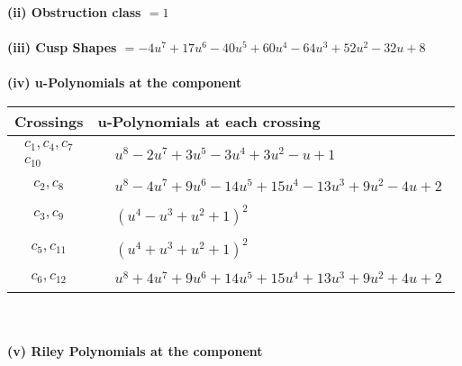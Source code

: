 \documentclass[1p]{elsarticle_modified}
\theoremstyle{definition}
\begin{document}
\flushleft \textbf{(ii) Obstruction class $= 1$}\\~\\
\flushleft \textbf{(iii) Cusp Shapes $= -4 u^7+17 u^6-40 u^5+60 u^4-64 u^3+52 u^2-32 u+8$}\\~\\
\newpage\renewcommand{\arraystretch}{1}
\flushleft \textbf{(iv) u-Polynomials at the component}\newline \\
\begin{tabular}{m{50pt}|m{274pt}}
Crossings & \hspace{64pt}u-Polynomials at each crossing \\
\hline $$\begin{aligned}c_{1},c_{4},c_{7}\\c_{10}\end{aligned}$$&$\begin{aligned}
&u^8-2 u^7+3 u^5-3 u^4+3 u^2- u+1
\end{aligned}$\\
\hline $$\begin{aligned}c_{2},c_{8}\end{aligned}$$&$\begin{aligned}
&u^8-4 u^7+9 u^6-14 u^5+15 u^4-13 u^3+9 u^2-4 u+2
\end{aligned}$\\
\hline $$\begin{aligned}c_{3},c_{9}\end{aligned}$$&$\begin{aligned}
&(u^4- u^3+u^2+1)^2
\end{aligned}$\\
\hline $$\begin{aligned}c_{5},c_{11}\end{aligned}$$&$\begin{aligned}
&(u^4+u^3+u^2+1)^2
\end{aligned}$\\
\hline $$\begin{aligned}c_{6},c_{12}\end{aligned}$$&$\begin{aligned}
&u^8+4 u^7+9 u^6+14 u^5+15 u^4+13 u^3+9 u^2+4 u+2
\end{aligned}$\\
\hline
\end{tabular}\\~\\
\newpage\renewcommand{\arraystretch}{1}
\flushleft \textbf{(v) Riley Polynomials at the component}\newline \\
\end{document}

